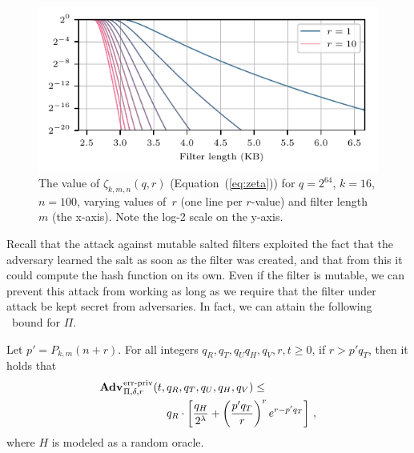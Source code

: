 \begin{figure}
  \hspace*{-10pt}
  \includegraphics{fig/bf-bound}
  \vspace{-24pt}
  \caption{
    The value of $\zeta_{k,m,n}(q,r)$ (Equation~(\ref{eq:zeta})) for $q=2^{64}$,
    $k=16$, $n=100$, varying values of~$r$ (one line per $r$-value) and filter
    length~$m$ (the x-axis).  Note the log-2 scale on the y-axis.
  }
  \label{fig:bf-bound}
\end{figure}


Recall that the attack against mutable salted filters exploited the fact that
the adversary learned the salt as soon as the filter was created, and that from
this it could compute the hash function on its own. Even if the filter is
mutable, we can prevent this attack from working as long as we require that the
filter under attack be kept secret from adversaries. In fact, we can attain the
following \erreps\ bound for $\Pi$.

\begin{theorem}\label{thm:sbf-erreps}
  Let $p' = P_{k,m}(n+r)$.
  For all integers $q_R, q_T, q_U q_H, q_V, r, t \geq 0$, if
  $r > p'q_T$, then it holds that
  \begin{eqnarray*}
    \begin{aligned}
      \Adv{\erreps}_{\Pi,\delta,r}(t,\,&q_R, q_T, q_U, q_H, q_V) \leq \\
          & q_R \cdot \left[
      \frac{q_H}{2^\lambda} +
      \left(\frac{p'q_T}{r}\right)^re^{r-p'q_T}\right]\,,
    \end{aligned}
\end{eqnarray*}
  where $H$ is modeled as a random oracle.
\end{theorem}

